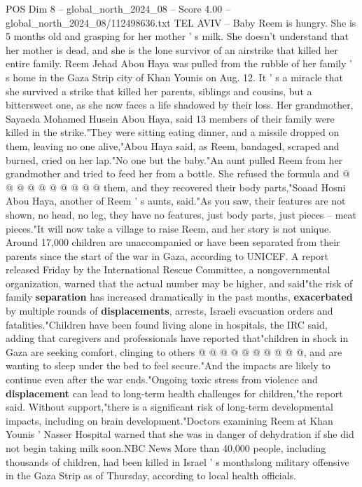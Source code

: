 \begin{textsample}{POS Dim 8 – global\_north\_2024\_08 – Score 4.00 – global\_north\_2024\_08/112498636.txt}  \label{ex:f8_pos_326}
TEL AVIV -- Baby Reem is hungry.
She is 5 months old and grasping for her mother ' s milk.
She doesn't understand that her mother is dead, and she is the lone survivor of an airstrike that killed her entire family.
Reem Jehad Abou Haya was pulled from the rubble of her family ' s home in the Gaza Strip city of Khan Younis on Aug. 12.
It ' s a miracle that she survived a strike that killed her parents, siblings and cousins, but a bittersweet one, as she now faces a life shadowed by their loss.
Her grandmother, Sayaeda Mohamed Husein Abou Haya, said 13 members of their family were killed in the strike."They were sitting eating dinner, and a missile dropped on them, leaving no one alive,"Abou Haya said, as Reem, bandaged, scraped and burned, cried on her lap."No one but the baby."An aunt pulled Reem from her grandmother and tried to feed her from a bottle.
She refused the formula and @ @ @ @ @ @ @ @ @ @ them, and they recovered their body parts,"Soaad Hosni Abou Haya, another of Reem ' s aunts, said."As you saw, their features are not shown, no head, no leg, they have no features, just body parts, just pieces -- meat pieces."It will now take a village to raise Reem, and her story is not unique.
Around 17,000 children are unaccompanied or have been separated from their parents since the start of the war in Gaza, according to UNICEF.
A report released Friday by the International Rescue Committee, a nongovernmental organization, warned that the actual number may be higher, and said"the risk of family \textbf{separation} has increased dramatically in the past months, \textbf{exacerbated} by multiple rounds of \textbf{displacements}, arrests, Israeli evacuation orders and fatalities."Children have been found living alone in hospitals, the IRC said, adding that caregivers and professionals have reported that"children in shock in Gaza are seeking comfort, clinging to others @ @ @ @ @ @ @ @ @ @, and are wanting to sleep under the bed to feel secure."And the impacts are likely to continue even after the war ends."Ongoing toxic stress from violence and \textbf{displacement} can lead to long-term health challenges for children,"the report said.
Without support,"there is a significant risk of long-term developmental impacts, including on brain development."Doctors examining Reem at Khan Younis ' Nasser Hospital warned that she was in danger of dehydration if she did not begin taking milk soon.NBC News More than 40,000 people, including thousands of children, had been killed in Israel ' s monthslong military offensive in the Gaza Strip as of Thursday, according to local health officials.

\end{textsample}
